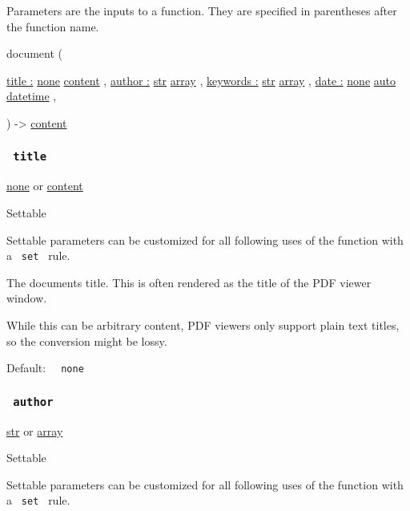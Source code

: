 \label{parameters-tooltip}
Parameters are the inputs to a function. They are specified in
parentheses after the function name.

{ document } (

{ \hyperref[parameters-title]{title :}
\href{/docs/reference/foundations/none/}{none}
\href{/docs/reference/foundations/content/}{content} , } {
\hyperref[parameters-author]{author :}
\href{/docs/reference/foundations/str/}{str}
\href{/docs/reference/foundations/array/}{array} , } {
\hyperref[parameters-keywords]{keywords :}
\href{/docs/reference/foundations/str/}{str}
\href{/docs/reference/foundations/array/}{array} , } {
\hyperref[parameters-date]{date :}
\href{/docs/reference/foundations/none/}{none}
\href{/docs/reference/foundations/auto/}{auto}
\href{/docs/reference/foundations/datetime/}{datetime} , }

) -\textgreater{} \href{/docs/reference/foundations/content/}{content}

\subsubsection{\texorpdfstring{\texttt{\ title\ }}{ title }}\label{parameters-title}

\href{/docs/reference/foundations/none/}{none} {or}
\href{/docs/reference/foundations/content/}{content}

{{ Settable }}

\label{parameters-title-settable-tooltip}
Settable parameters can be customized for all following uses of the
function with a \texttt{\ set\ } rule.

The document\textquotesingle s title. This is often rendered as the
title of the PDF viewer window.

While this can be arbitrary content, PDF viewers only support plain text
titles, so the conversion might be lossy.

Default: \texttt{\ }{\texttt{\ none\ }}\texttt{\ }

\subsubsection{\texorpdfstring{\texttt{\ author\ }}{ author }}\label{parameters-author}

\href{/docs/reference/foundations/str/}{str} {or}
\href{/docs/reference/foundations/array/}{array}

{{ Settable }}

\label{parameters-author-settable-tooltip}
Settable parameters can be customized for all following uses of the
function with a \texttt{\ set\ } rule.

